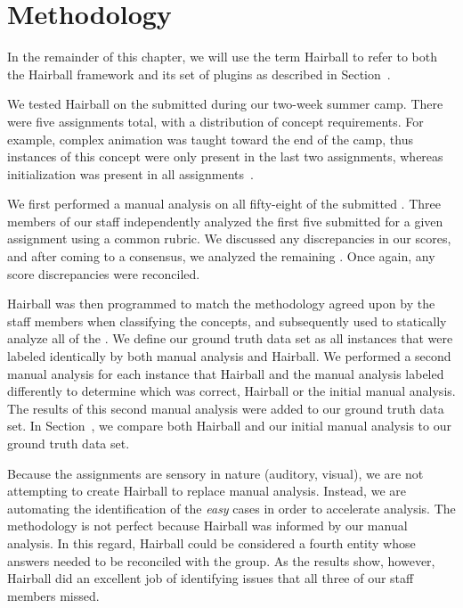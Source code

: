 \section{Methodology} 
In the remainder of this chapter, we will use the term Hairball to refer to
both the Hairball framework and its set of plugins as described in
Section~.

We tested Hairball on the  submitted during our two-week summer
camp.  There were five assignments total, with a distribution of concept
requirements. For example, complex animation was taught toward the end of the
camp, thus instances of this concept were only present in the last two
assignments, whereas initialization was present in all
assignments~\cite{Franklin:2013:SBO}.

We first performed a manual analysis on all fifty-eight of the submitted
.  Three members of our staff independently analyzed the first five
 submitted for a given assignment using a common rubric. We
discussed any discrepancies in our scores, and after coming to a consensus, we
analyzed the remaining . Once again, any score discrepancies were
reconciled.

Hairball was then programmed to match the methodology agreed upon by the staff
members when classifying the concepts, and subsequently used to statically
analyze all of the . We define our ground truth data set as all
instances that were labeled identically by both manual analysis and
Hairball. We performed a second manual analysis for each instance that Hairball
and the manual analysis labeled differently to determine which was correct,
Hairball or the initial manual analysis. The results of this second manual
analysis were added to our ground truth data set. In
Section~, we compare both Hairball and our initial manual
analysis to our ground truth data set.

Because the assignments are sensory in nature (auditory, visual), we are not
attempting to create Hairball to replace manual analysis.  Instead, we are
automating the identification of the \emph{easy} cases in order to accelerate
analysis.  The methodology is not perfect because Hairball was informed by our
manual analysis. In this regard, Hairball could be considered a fourth entity
whose answers needed to be reconciled with the group.  As the results show,
however, Hairball did an excellent job of identifying issues that all three of
our staff members missed.

